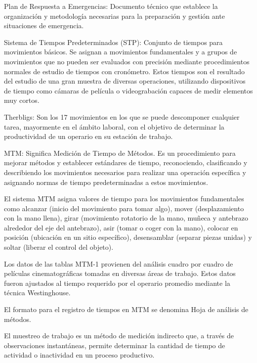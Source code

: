     Plan de Respuesta a Emergencias: Documento técnico que establece la organización y metodología necesarias para la preparación y gestión ante situaciones de emergencia.
    
    Sistema de Tiempos Predeterminados (STP): Conjunto de tiempos para movimientos básicos. Se asignan a movimientos fundamentales y a grupos de movimientos que no pueden ser evaluados con precisión mediante procedimientos normales de estudio de tiempos con cronómetro. Estos tiempos son el resultado del estudio de una gran muestra de diversas operaciones, utilizando dispositivos de tiempo como cámaras de película o videograbación capaces de medir elementos muy cortos.
    
    Therbligs: Son los 17 movimientos en los que se puede descomponer cualquier tarea, mayormente en el ámbito laboral, con el objetivo de determinar la productividad de un operario en su estación de trabajo.
    
    MTM: Significa Medición de Tiempo de Métodos. Es un procedimiento para mejorar métodos y establecer estándares de tiempo, reconociendo, clasificando y describiendo los movimientos necesarios para realizar una operación específica y asignando normas de tiempo predeterminadas a estos movimientos. 
    
    El sistema MTM asigna valores de tiempo para los movimientos fundamentales como alcanzar (inicio del movimiento para tomar algo), mover (desplazamiento con la mano llena), girar (movimiento rotatorio de la mano, muñeca y antebrazo alrededor del eje del antebrazo), asir (tomar o coger con la mano), colocar en posición (ubicación en un sitio específico), desensamblar (separar piezas unidas) y soltar (liberar el control del objeto). 
    
    Los datos de las tablas MTM-1 provienen del análisis cuadro por cuadro de películas cinematográficas tomadas en diversas áreas de trabajo. Estos datos fueron ajustados al tiempo requerido por el operario promedio mediante la técnica Westinghouse.
    
    El formato para el registro de tiempos en MTM se denomina Hoja de análisis de métodos.
    
    El muestreo de trabajo es un método de medición indirecto que, a través de observaciones instantáneas, permite determinar la cantidad de tiempo de actividad o inactividad en un proceso productivo.
